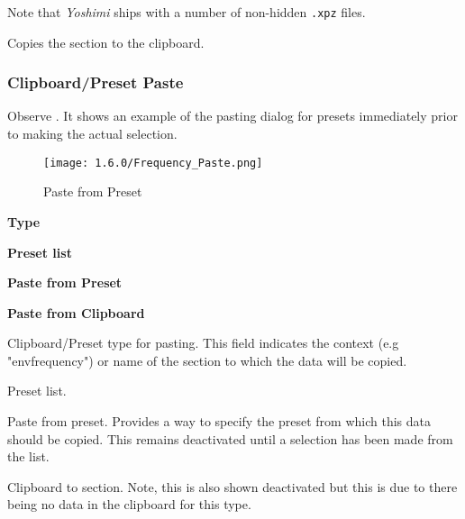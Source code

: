    Note that \textsl{Yoshimi} ships with a number of non-hidden \texttt{.xpz}
   files.

   Copies the section to the clipboard.

\subsubsection{Clipboard/Preset Paste}
\label{subsubsec:clipboard_paste}

   Observe .
   It shows an example of the pasting dialog for presets immediately prior to making
   the actual selection.

\begin{figure}[H]
   \centering
   \texttt{[image: 1.6.0/Frequency\_Paste.png]}
   \caption[Paste from Preset]{Paste from Preset}
   \label{fig:paste_to_clipboard}
\end{figure}

   \begin{enumber}
      \item \textbf{Type}
      \item \textbf{Preset list}
      \item \textbf{Paste from Preset}
      \item \textbf{Paste from Clipboard}
   \end{enumber}

   \setcounter{ItemCounter}{0}      %

   Clipboard/Preset type for pasting.
   This field indicates the context (e.g "envfrequency") or name of the
   section to which the data will be copied.

   Preset list.

   Paste from preset.
   Provides a way to specify the preset from which this data should be copied.
   This remains deactivated until a selection has been made from the list.

   Clipboard to section. Note, this is also shown deactivated but this is due to there
   being no data in the clipboard for this type.


